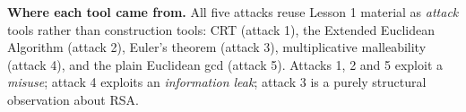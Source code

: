 \documentclass[11pt]{article}
\begin{document}
\hrulefill

\medskip
\textbf{Where each tool came from.} All five attacks reuse Lesson 1 material as \emph{attack} tools rather than construction tools: CRT (attack 1), the Extended Euclidean Algorithm (attack 2), Euler's theorem (attack 3), multiplicative malleability (attack 4), and the plain Euclidean gcd (attack 5). Attacks 1, 2 and 5 exploit a \emph{misuse}; attack 4 exploits an \emph{information leak}; attack 3 is a purely structural observation about RSA.
\end{document}
